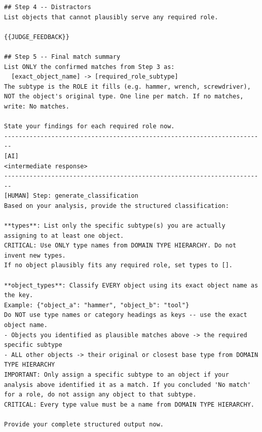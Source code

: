 \begin{lstlisting}
## Step 4 -- Distractors
List objects that cannot plausibly serve any required role.

{{JUDGE_FEEDBACK}}

## Step 5 -- Final match summary
List ONLY the confirmed matches from Step 3 as:
  [exact_object_name] -> [required_role_subtype]
The subtype is the ROLE it fills (e.g. hammer, wrench, screwdriver), NOT the object's original type. One line per match. If no matches, write: No matches.

State your findings for each required role now.
------------------------------------------------------------------------
[AI]
<intermediate response>
------------------------------------------------------------------------
[HUMAN] Step: generate_classification
Based on your analysis, provide the structured classification:

**types**: List only the specific subtype(s) you are actually assigning to at least one object.
CRITICAL: Use ONLY type names from DOMAIN TYPE HIERARCHY. Do not invent new types.
If no object plausibly fits any required role, set types to [].

**object_types**: Classify EVERY object using its exact object name as the key.
Example: {"object_a": "hammer", "object_b": "tool"}
Do NOT use type names or category headings as keys -- use the exact object name.
- Objects you identified as plausible matches above -> the required specific subtype
- ALL other objects -> their original or closest base type from DOMAIN TYPE HIERARCHY
IMPORTANT: Only assign a specific subtype to an object if your analysis above identified it as a match. If you concluded 'No match' for a role, do not assign any object to that subtype.
CRITICAL: Every type value must be a name from DOMAIN TYPE HIERARCHY.

Provide your complete structured output now.
\end{lstlisting}

